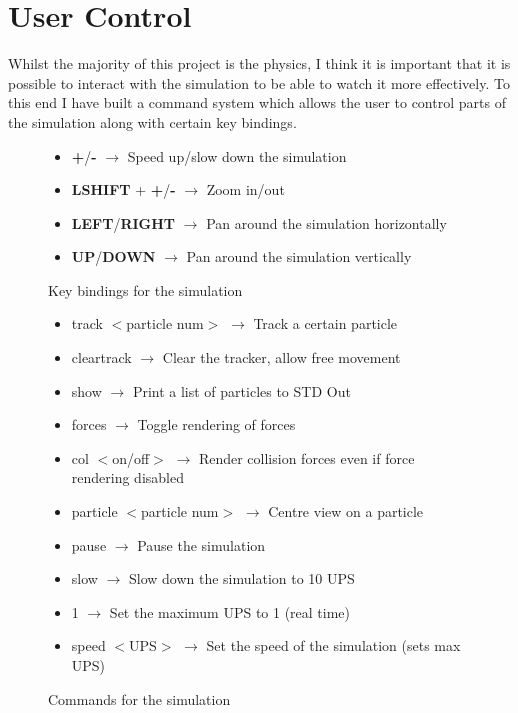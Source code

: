 \section{User Control}
	
	Whilst the majority of this project is the physics, I think it is important that it is possible to interact with the simulation to be able to watch it more effectively. To this end I have built a command system which allows the user to control parts of the simulation along with certain key bindings.
	
	\begin{figure}[h]
		\begin{itemize}
			\item \textbf{+}/\textbf{-} $\rightarrow$ Speed up/slow down the simulation
			\item \textbf{LSHIFT} + \textbf{+}/\textbf{-} $\rightarrow$ Zoom in/out
			\item \textbf{LEFT}/\textbf{RIGHT} $\rightarrow$ Pan around the simulation horizontally
			\item \textbf{UP}/\textbf{DOWN} $\rightarrow$ Pan around the simulation vertically
		\end{itemize}
		\caption{Key bindings for the simulation}
		\label{fig:keybindings}
	\end{figure}
	
	\begin{figure}[h]
		\begin{itemize}
			\item track $<$particle num$>$ $\rightarrow$ Track a certain particle
			\item cleartrack $\rightarrow$ Clear the tracker, allow free movement
			\item show $\rightarrow$ Print a list of particles to STD Out
			\item forces $\rightarrow$ Toggle rendering of forces
			\item col $<$on/off$>$ $\rightarrow$ Render collision forces even if force rendering disabled
			\item particle $<$particle num$>$ $\rightarrow$ Centre view on a particle
			\item pause $\rightarrow$ Pause the simulation
			\item slow $\rightarrow$ Slow down the simulation to 10 UPS
			\item 1 $\rightarrow$ Set the maximum UPS to 1 (real time)
			\item speed $<$UPS$>$ $\rightarrow$ Set the speed of the simulation (sets max UPS)
			
			
		\end{itemize}
		\caption{Commands for the simulation}
		\label{fig:commands}
	\end{figure}
	
